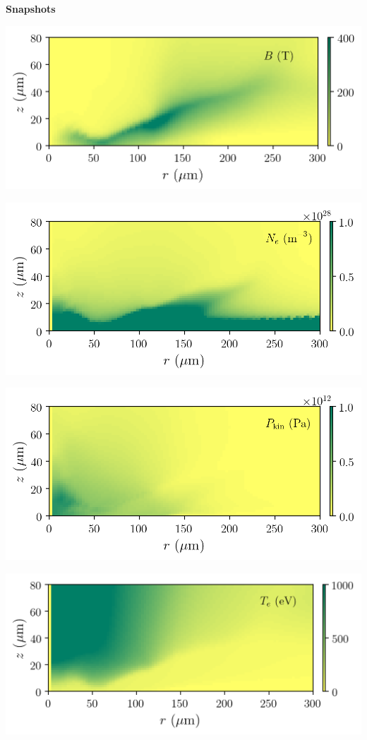 \documentclass{report}
\begin{document}
{\bf Snapshots}

\begin{center}
\includegraphics[width=0.8\linewidth]{luli2017-B.png}
\end{center}

\begin{center}
\includegraphics[width=0.8\linewidth]{luli2017-Ne.png}
\end{center}

\begin{center}
\includegraphics[width=0.8\linewidth]{luli2017-P.png}
\end{center}

\begin{center}
\includegraphics[width=0.8\linewidth]{luli2017-Te.png}
\end{center}
\end{document}
